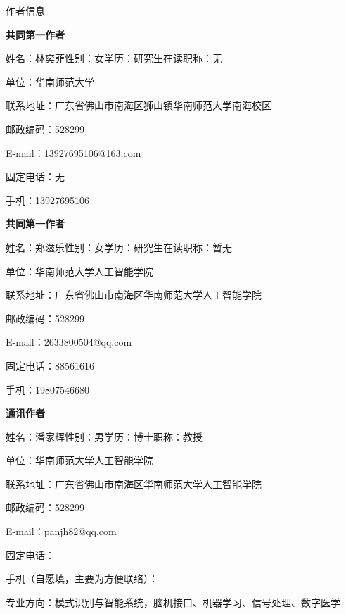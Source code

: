 \documentclass[UTF8,zihao=5,fontset=none]{ctexart}
\newcommand{\song}{\CJKfamily{song}}
\newcommand{\hei}{\CJKfamily{hei}}
\begin{document}
\clearpage
\thispagestyle{empty}
\begin{center}
  {\hei\fontsize{16pt}{16pt}\selectfont 作者信息\par}
\end{center}
\vspace{32pt}
{\song\fontsize{12pt}{18pt}\selectfont
\setlength{\parindent}{0pt}
\noindent\bfseries 共同第一作者\mdseries\par
\noindent 姓名：林奕菲\quad 性别：女\quad 学历：研究生在读\quad 职称：无\par
\noindent 单位：华南师范大学\par
\noindent 联系地址：广东省佛山市南海区狮山镇华南师范大学南海校区\par
\noindent 邮政编码：528299\par
\noindent E-mail：13927695106@163.com\par
\noindent 固定电话：无\par
\noindent 手机：13927695106\par
\vspace{13pt}
\noindent\bfseries 共同第一作者\mdseries\par
\noindent 姓名：郑滋乐\quad 性别：女\quad 学历：研究生在读\quad 职称：暂无\par
\noindent 单位：华南师范大学人工智能学院\par
\noindent 联系地址：广东省佛山市南海区华南师范大学人工智能学院\par
\noindent 邮政编码：528299\par
\noindent E-mail：2633800504@qq.com\par
\noindent 固定电话：88561616\par
\noindent 手机：19807546680\par
\vspace{13pt}
\noindent\bfseries 通讯作者\mdseries\par
\noindent 姓名：潘家辉\quad 性别：男\quad 学历：博士\quad 职称：教授\par
\noindent 单位：华南师范大学人工智能学院\par
\noindent 联系地址：广东省佛山市南海区华南师范大学人工智能学院\par
\noindent 邮政编码：528299\par
\noindent E-mail：panjh82@qq.com\par
\noindent 固定电话：\par
\noindent 手机（自愿填，主要为方便联络）：\par
\noindent 专业方向：模式识别与智能系统，脑机接口、机器学习、信号处理、数字医学\par
}
\end{document}
